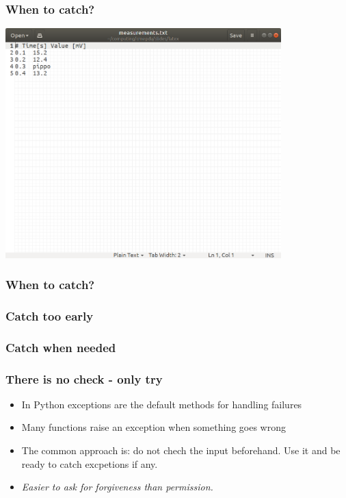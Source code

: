 \documentclass[9pt]{beamer}
\begin{document}
\begin{frame}
  \frametitle{When to catch?}
  \centering
  \includegraphics[width=0.8\textwidth]{lab_file.png}
\end{frame}



\begin{frame}
  \frametitle{When to catch?}
  
\end{frame}


\begin{frame}
  \frametitle{Catch too early}
  
\end{frame}


\begin{frame}
  \frametitle{Catch when needed}
  
\end{frame}

\begin{frame}
  \frametitle{There is no check - only try}

  \begin{itemize}
    \item In Python exceptions are the default methods for handling failures
    \item Many functions raise an exception when something goes wrong
    \item The common approach is: do not chech the input beforehand. Use it and
          be ready to catch excpetions if any.
    \item \textit{Easier to ask for forgiveness than permission.} 
  \end{itemize}
\end{frame}
\end{document}
